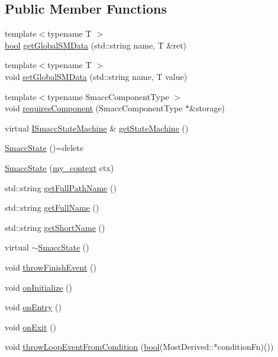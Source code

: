 \subsection*{Public Member Functions}
\begin{DoxyCompactItemize}
\item 
{\footnotesize template$<$typename T $>$ }\\\hyperlink{classbool}{bool} \hyperlink{classsmacc_1_1SmaccState_ad53b5be2760eb7ffb50f3b2e542b65f1}{get\+Global\+S\+M\+Data} (std\+::string name, T \&ret)
\item 
{\footnotesize template$<$typename T $>$ }\\void \hyperlink{classsmacc_1_1SmaccState_a98f2673b257479e0a3615d5d8279a591}{set\+Global\+S\+M\+Data} (std\+::string name, T value)
\item 
{\footnotesize template$<$typename Smacc\+Component\+Type $>$ }\\void \hyperlink{classsmacc_1_1SmaccState_a2febb778d5c3d80b9c034576b5a92b65}{requires\+Component} (Smacc\+Component\+Type $\ast$\&storage)
\item 
virtual \hyperlink{classsmacc_1_1ISmaccStateMachine}{I\+Smacc\+State\+Machine} \& \hyperlink{classsmacc_1_1SmaccState_afc39f8e0ca4001b2159a100da2fccd0e}{get\+State\+Machine} ()
\item 
\hyperlink{classsmacc_1_1SmaccState_a2fbeaca0f063a909d17de2c3040c8d17}{Smacc\+State} ()=delete
\item 
\hyperlink{classsmacc_1_1SmaccState_adc225018fe91da47e6e9f1d20150b26a}{Smacc\+State} (\hyperlink{structsmacc_1_1SmaccState_1_1my__context}{my\+\_\+context} ctx)
\item 
std\+::string \hyperlink{classsmacc_1_1SmaccState_a1a2ae90b80ba8ca88b4b9b66972abfbd}{get\+Full\+Path\+Name} ()
\item 
std\+::string \hyperlink{classsmacc_1_1SmaccState_a897dbdfe52a8b944d4bf1844ddcc3aa5}{get\+Full\+Name} ()
\item 
std\+::string \hyperlink{classsmacc_1_1SmaccState_a4db028a85244653e48957d2b3371413d}{get\+Short\+Name} ()
\item 
virtual \hyperlink{classsmacc_1_1SmaccState_a41b2515faf76648c6d69fe09108d2691}{$\sim$\+Smacc\+State} ()
\item 
void \hyperlink{classsmacc_1_1SmaccState_a56ccdfaf818ed6409dcbd4ab8b01c60e}{throw\+Finish\+Event} ()
\item 
void \hyperlink{classsmacc_1_1SmaccState_a49e958861b6ddbe9468e39c1919fde92}{on\+Initialize} ()
\item 
void \hyperlink{classsmacc_1_1SmaccState_a4a10a74fdbe51a798b8d651668b8ed9a}{on\+Entry} ()
\item 
void \hyperlink{classsmacc_1_1SmaccState_a82ca7c69153e86dc5eedf3f909560f3a}{on\+Exit} ()
\item 
void \hyperlink{classsmacc_1_1SmaccState_a4f3083a54914820cd7b9eb5a6221f29f}{throw\+Loop\+Event\+From\+Condition} (\hyperlink{classbool}{bool}(Most\+Derived\+::$\ast$condition\+Fn)())
\end{DoxyCompactItemize}
